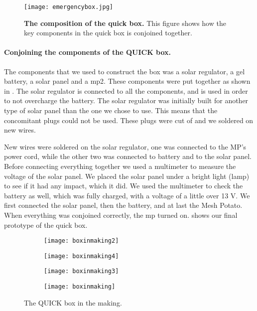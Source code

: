 \begin{figure}[b]
  \centering
      \texttt{[image: emergencybox.jpg]}
  \caption [The composition of the \gls{quick} box]{\textbf{The composition of the \gls{quick} box.} This figure shows how the key components in the \gls{quick} box is conjoined together.}
  \label{fig:emergencybox}
\end{figure}

\paragraph{Conjoining the components of the QUICK box.}
The components that we used to construct the box was a solar regulator, a gel battery, a solar panel and a \gls{mp2}. These components were put together as shown in . The solar regulator is connected to all the components, and is used in order to not overcharge the battery. The solar regulator was initially built for another type of solar panel than the one we chose to use. This means that the concomitant plugs could not be used. These plugs were cut of and we soldered on new wires.  

New wires were soldered on the solar regulator, one was connected to the MP's power cord, while the other two was connected to battery and to the solar panel. Before connecting everything together we used a multimeter to measure the voltage of the solar panel. We placed the solar panel under a bright light (lamp) to see if it had any impact, which it did. We used the multimeter to check the battery as well, which was fully charged, with a voltage of a little over 13 V. 
We first connected the solar panel, then the battery, and at last the Mesh Potato. When everything was conjoined correctly, the \gls{mp} turned on.  shows our final prototype of the \gls{quick} box. 

\begin{figure}
        \centering
        \begin{subfigure}[t]{0.4\textwidth}
                \texttt{[image: boxinmaking2]}
                \label{fig:boxinmaking2}
        \end{subfigure}
        \begin{subfigure}[t]{0.4\textwidth}
                \texttt{[image: boxinmaking4]}
                \label{fig:boxinmaking}
        \end{subfigure}
         \begin{subfigure}[t]{0.3\textwidth}
                \texttt{[image: boxinmaking3]} 
                \label{fig:boxinmaking3}
        \end{subfigure}
        \begin{subfigure}[t]{0.4\textwidth}
                \texttt{[image: boxinmaking]} 
                \label{fig:boxinmaking4}
        \end{subfigure}
\caption{The QUICK box in the making.} \label{fig:boxinmaking}
\end{figure}

